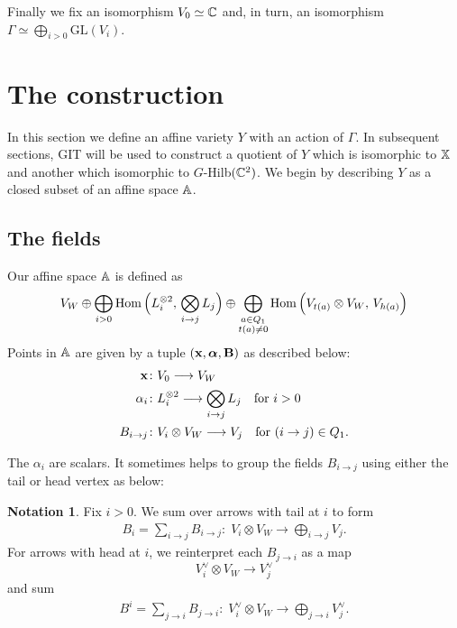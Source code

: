 \documentclass{amsart}
\newcommand{\balpha}{\boldsymbol{\alpha}}
\theoremstyle{definition}
\newtheorem{notn}[theorem]{Notation}
\newcommand\VW{V_W}
\newcommand\Y{Y}
\begin{document}
Finally we fix an isomorphism  $V_0\simeq \mathbb{C}$ and, in turn, an isomorphism $\Gamma\simeq \bigoplus_{i>0} \text{GL}(V_i)$.

\section{The construction}

In this section we define an affine variety $\Y$ with an action of $\Gamma$. In subsequent sections, GIT will be used to construct a quotient of $\Y$ which is isomorphic to $\mathbb{X}$ and another which isomorphic to $G$-Hilb$(\mathbb{C}^2)$.
We begin by describing $\Y$ as a closed subset of an affine space $\mathbb{A}$.

\subsection{The fields}
Our affine space $\mathbb{A}$ is defined as
\begin{equation*}
    \VW \oplus \bigoplus_{i>0} \Hom\Big(L_i^{\otimes 2},\, \bigotimes_{i \rightarrow j} L_j\Big) \oplus  \bigoplus_{\substack{a\in Q_1\\t(a)\neq 0}} \Hom\Big(V_{t(a)} \otimes \VW,\,  V_{h(a)}\Big) 
\end{equation*}
Points in $\mathbb{A}$ are given by a tuple $(\bfx,\balpha, \bfB)$ as described below:
\begin{align}
\bfx \colon &V_0 \longrightarrow \VW \label{fd:x} \\
\alpha_i \colon &L_i^{\otimes 2}\longrightarrow \bigotimes_{i \rightarrow j} L_j  \label{fd:alpha}\quad\mbox{for }i>0 \\
B_{i \rightarrow j} \colon &V_i \otimes \VW \longrightarrow V_j  \label{fd:B}\quad\mbox{for }(i \rightarrow j) \in Q_1. 
\end{align}

The $\alpha_i$ are scalars. 
It sometimes helps to group the fields $B_{i \rightarrow j}$ using either the tail or head vertex as below:

\begin{notn}\label{notn:B^i}
Fix $i>0$. 
We sum over arrows with tail at $i$ to form
\begin{align*}
B_i = \sum_{i \rightarrow j} B_{i \rightarrow j}:\; V_i\otimes\VW \longrightarrow\bigoplus_{i\to j} V_j.
\end{align*}
For arrows with head at $i$, we reinterpret each $B_{j \rightarrow i}$ as a map
$$ V_{i}^\vee\otimes \VW \longrightarrow V_{j}^\vee $$
and sum
\begin{align*}
B^i = \sum_{j \rightarrow i} B_{j \rightarrow i}:\; V_i^\vee \otimes \VW \longrightarrow \bigoplus_{j\to i} V_j^\vee.
\end{align*}
\end{notn}
\end{document}
